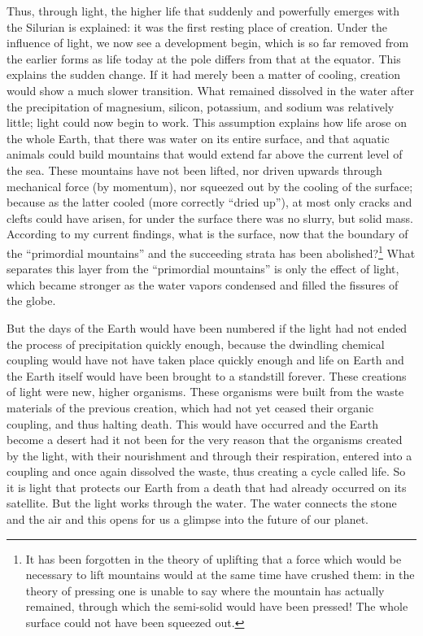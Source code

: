 \documentclass[a4paper, 12pt, oneside]{article}
\begin{document}
Thus, through light, the higher life that suddenly and powerfully emerges with the Silurian is explained: it was the first resting place of creation. Under the influence of light, we now see a development begin, which is so far removed from the earlier forms as life today at the pole differs from that at the equator. This explains the sudden change. If it had merely been a matter of cooling, creation would show a much slower transition. What remained dissolved in the water after the precipitation of magnesium, silicon, potassium, and sodium was relatively little; light could now begin to work. This assumption explains how life arose on the whole Earth, that there was water on its entire surface, and that aquatic animals could build mountains that would extend far above the current level of the sea. These mountains have not been lifted, nor driven upwards through mechanical force (by momentum), nor squeezed out by the cooling of the surface; because as the latter cooled (more correctly ``dried up''), at most only cracks and clefts could have arisen, for under the surface there was no slurry, but solid mass. According to my current findings, what is the surface, now that the boundary of the ``primordial mountains'' and the succeeding strata has been abolished?\footnote{It has been forgotten in the theory of uplifting that a force which would be necessary to lift mountains would at the same time have crushed them: in the theory of pressing one is unable to say where the mountain has actually remained, through which the semi-solid would have been pressed! The whole surface could not have been squeezed out.} What separates this layer from the ``primordial mountains'' is only the effect of light, which became stronger as the water vapors condensed and filled the fissures of the globe.

But the days of the Earth would have been numbered if the light had not ended the process of precipitation quickly enough, because the dwindling chemical coupling would have not have taken place quickly enough and life on Earth and the Earth itself would have been brought to a standstill forever. These creations of light were new, higher organisms. These organisms were built from the waste materials of the previous creation, which had not yet ceased their organic coupling, and thus halting death. This would have occurred and the Earth become a desert had it not been for the very reason that the organisms created by the light, with their nourishment and through their respiration, entered into a coupling and once again dissolved the waste, thus creating a cycle called life. So it is light that protects our Earth from a death that had already occurred on its satellite. But the light works through the water. The water connects the stone and the air and this opens for us a glimpse into the future of our planet.
\clearpage
\end{document}
